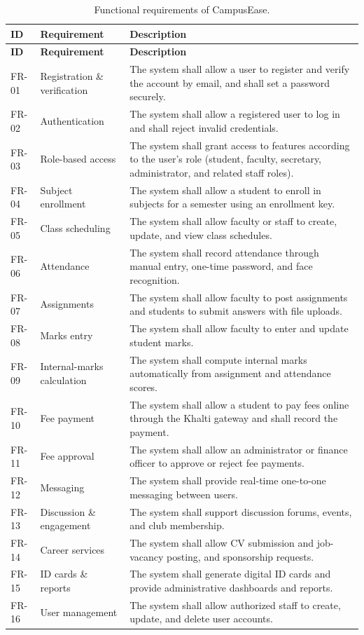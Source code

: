 \documentclass[12pt,a4paper]{report}
\begin{document}
\begin{longtable}{|p{1.3cm}|p{4cm}|p{7.5cm}|}
\caption{Functional requirements of CampusEase.}
\label{tab:fr}\\
\hline
\textbf{ID} & \textbf{Requirement} & \textbf{Description} \\
\hline
\endfirsthead
\hline
\textbf{ID} & \textbf{Requirement} & \textbf{Description} \\
\hline
\endhead
FR-01 & Registration \& verification & The system shall allow a user to register and verify the account by email, and shall set a password securely. \\
\hline
FR-02 & Authentication & The system shall allow a registered user to log in and shall reject invalid credentials. \\
\hline
FR-03 & Role-based access & The system shall grant access to features according to the user's role (student, faculty, secretary, administrator, and related staff roles). \\
\hline
FR-04 & Subject enrollment & The system shall allow a student to enroll in subjects for a semester using an enrollment key. \\
\hline
FR-05 & Class scheduling & The system shall allow faculty or staff to create, update, and view class schedules. \\
\hline
FR-06 & Attendance & The system shall record attendance through manual entry, one-time password, and face recognition. \\
\hline
FR-07 & Assignments & The system shall allow faculty to post assignments and students to submit answers with file uploads. \\
\hline
FR-08 & Marks entry & The system shall allow faculty to enter and update student marks. \\
\hline
FR-09 & Internal-marks calculation & The system shall compute internal marks automatically from assignment and attendance scores. \\
\hline
FR-10 & Fee payment & The system shall allow a student to pay fees online through the Khalti gateway and shall record the payment. \\
\hline
FR-11 & Fee approval & The system shall allow an administrator or finance officer to approve or reject fee payments. \\
\hline
FR-12 & Messaging & The system shall provide real-time one-to-one messaging between users. \\
\hline
FR-13 & Discussion \& engagement & The system shall support discussion forums, events, and club membership. \\
\hline
FR-14 & Career services & The system shall allow CV submission and job-vacancy posting, and sponsorship requests. \\
\hline
FR-15 & ID cards \& reports & The system shall generate digital ID cards and provide administrative dashboards and reports. \\
\hline
FR-16 & User management & The system shall allow authorized staff to create, update, and delete user accounts. \\
\hline
\end{longtable}
\end{document}
